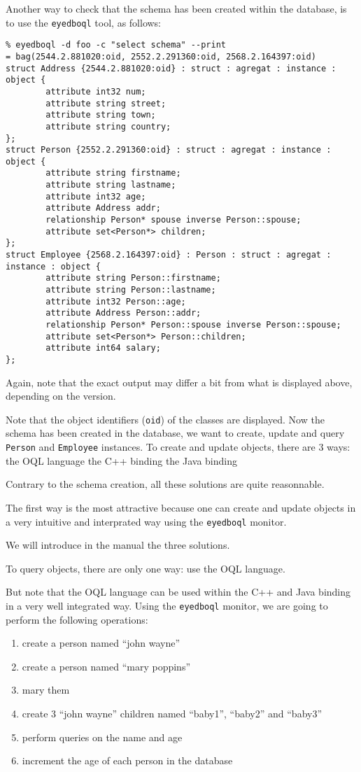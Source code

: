 Another way to check that the schema has been created within the database,
is to use the \texttt{eyedboql} tool, as follows:
\verbsize \begin{verbatim}
% eyedboql -d foo -c "select schema" --print
= bag(2544.2.881020:oid, 2552.2.291360:oid, 2568.2.164397:oid)
struct Address {2544.2.881020:oid} : struct : agregat : instance : object { 
        attribute int32 num;
        attribute string street;
        attribute string town;
        attribute string country;
};
struct Person {2552.2.291360:oid} : struct : agregat : instance : object { 
        attribute string firstname;
        attribute string lastname;
        attribute int32 age;
        attribute Address addr;
        relationship Person* spouse inverse Person::spouse;
        attribute set<Person*> children;
};
struct Employee {2568.2.164397:oid} : Person : struct : agregat : instance : object { 
        attribute string Person::firstname;
        attribute string Person::lastname;
        attribute int32 Person::age;
        attribute Address Person::addr;
        relationship Person* Person::spouse inverse Person::spouse;
        attribute set<Person*> Person::children;
        attribute int64 salary;
};
\end{verbatim}
\normalsize

Again, note that the exact output may differ a bit from what is displayed above, depending on the \eyedb version.

Note that the object identifiers (\texttt{oid}) of the classes are displayed.
Now the schema has been created in the database, we want to create, update
and query \texttt{Person} and \texttt{Employee} instances.
To create and update objects, there are 3 ways:
\idt the OQL language
\idt the C++ binding
\idt the Java binding

Contrary to the schema creation, all these solutions are quite reasonnable.

The first way is the most attractive because one can create and update objects
in a very intuitive and interprated way using the \texttt{eyedboql} monitor.

We will introduce in the manual the three solutions.

To query objects, there are only one way: use the OQL language.

But note that the OQL language can be used within the C++ and Java binding
in a very well integrated way.
Using the \texttt{eyedboql} monitor, we are going to perform the following
operations:
\begin{enumerate}
\item create a person named ``john wayne''
\item create a person named ``mary poppins''
\item mary them
\item create 3 ``john wayne'' children named ``baby1'', ``baby2'' and ``baby3''
\item perform queries on the name and age
\item increment the age of each person in the database
\end{enumerate}

